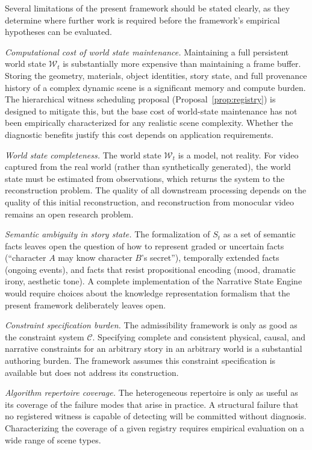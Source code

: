 \documentclass[12pt,a4paper]{article}
\theoremstyle{plain}
\theoremstyle{definition}
\theoremstyle{remark}
\begin{document}
Several limitations of the present framework should be stated clearly, as they determine where further work is required before the framework's empirical hypotheses can be evaluated.

\textit{Computational cost of world state maintenance.} Maintaining a full persistent world state $\mathcal{W}_t$ is substantially more expensive than maintaining a frame buffer. Storing the geometry, materials, object identities, story state, and full provenance history of a complex dynamic scene is a significant memory and compute burden. The hierarchical witness scheduling proposal (Proposal~\ref{prop:registry}) is designed to mitigate this, but the base cost of world-state maintenance has not been empirically characterized for any realistic scene complexity. Whether the diagnostic benefits justify this cost depends on application requirements.

\textit{World state completeness.} The world state $\mathcal{W}_t$ is a model, not reality. For video captured from the real world (rather than synthetically generated), the world state must be estimated from observations, which returns the system to the reconstruction problem. The quality of all downstream processing depends on the quality of this initial reconstruction, and reconstruction from monocular video remains an open research problem.

\textit{Semantic ambiguity in story state.} The formalization of $S_t$ as a set of semantic facts leaves open the question of how to represent graded or uncertain facts (``character $A$ may know character $B$'s secret''), temporally extended facts (ongoing events), and facts that resist propositional encoding (mood, dramatic irony, aesthetic tone). A complete implementation of the Narrative State Engine would require choices about the knowledge representation formalism that the present framework deliberately leaves open.

\textit{Constraint specification burden.} The admissibility framework is only as good as the constraint system $\mathcal{C}$. Specifying complete and consistent physical, causal, and narrative constraints for an arbitrary story in an arbitrary world is a substantial authoring burden. The framework assumes this constraint specification is available but does not address its construction.

\textit{Algorithm repertoire coverage.} The heterogeneous repertoire is only as useful as its coverage of the failure modes that arise in practice. A structural failure that no registered witness is capable of detecting will be committed without diagnosis. Characterizing the coverage of a given registry requires empirical evaluation on a wide range of scene types.
\end{document}
